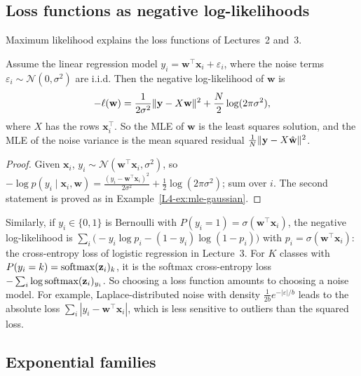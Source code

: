 \subsection{Loss functions as negative log-likelihoods}

Maximum likelihood explains the loss functions of Lectures~2 and~3.

\begin{proposition}\label{L4-prop:ls-mle}
    Assume the linear regression model $y_i = \mathbf{w}^\top\mathbf{x}_i + \varepsilon_i$, where the noise terms $\varepsilon_i \sim \mathcal{N}(0, \sigma^2)$ are i.i.d. Then the negative log-likelihood of $\mathbf{w}$ is
    \[-\ell(\mathbf{w}) = \frac{1}{2\sigma^2}\lVert \mathbf{y} - X\mathbf{w} \rVert^2 + \frac{N}{2}\log(2\pi\sigma^2),\]
    where $X$ has the rows $\mathbf{x}_i^\top$. So the MLE of $\mathbf{w}$ is the least squares solution, and the MLE of the noise variance is the mean squared residual $\frac{1}{N}\lVert \mathbf{y} - X\hat{\mathbf{w}} \rVert^2$.
\end{proposition}

\begin{proof}
    Given $\mathbf{x}_i$, $y_i \sim \mathcal{N}(\mathbf{w}^\top\mathbf{x}_i, \sigma^2)$, so $-\log p(y_i \mid \mathbf{x}_i, \mathbf{w}) = \frac{(y_i - \mathbf{w}^\top\mathbf{x}_i)^2}{2\sigma^2} + \frac{1}{2}\log(2\pi\sigma^2)$; sum over $i$. The second statement is proved as in Example~\ref{L4-ex:mle-gaussian}.
\end{proof}

Similarly, if $y_i \in \{0, 1\}$ is Bernoulli with $P(y_i = 1) = \sigma(\mathbf{w}^\top\mathbf{x}_i)$, the negative log-likelihood is $\sum_i \big(-y_i\log p_i - (1 - y_i)\log(1 - p_i)\big)$ with $p_i = \sigma(\mathbf{w}^\top\mathbf{x}_i)$: the cross-entropy loss of logistic regression in Lecture~3. For $K$ classes with $P(y_i = k) = \operatorname{softmax}(\mathbf{z}_i)_k$, it is the softmax cross-entropy loss $-\sum_i \log\operatorname{softmax}(\mathbf{z}_i)_{y_i}$. So choosing a loss function amounts to choosing a noise model. For example, Laplace-distributed noise with density $\frac{1}{2b}e^{-|\varepsilon|/b}$ leads to the absolute loss $\sum_i |y_i - \mathbf{w}^\top\mathbf{x}_i|$, which is less sensitive to outliers than the squared loss.

\subsection{Exponential families}\label{L4-sec:exp-family}

